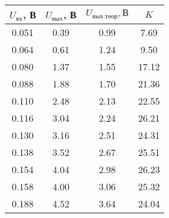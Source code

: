 \begin{tabular}{|c|c|c|c|}
  \hline
$U_{вх}$, В & $U_{вых}$, В & $U_{вых.теор}, В$ & $K$ \\ 
  \hline
0.051 & 0.39 & 0.99 & 7.69 \\ 
   \hline
0.064 & 0.61 & 1.24 & 9.50 \\ 
   \hline
0.080 & 1.37 & 1.55 & 17.12 \\ 
   \hline
0.088 & 1.88 & 1.70 & 21.36 \\ 
   \hline
0.110 & 2.48 & 2.13 & 22.55 \\ 
   \hline
0.116 & 3.04 & 2.24 & 26.21 \\ 
   \hline
0.130 & 3.16 & 2.51 & 24.31 \\ 
   \hline
0.138 & 3.52 & 2.67 & 25.51 \\ 
   \hline
0.154 & 4.04 & 2.98 & 26.23 \\ 
   \hline
0.158 & 4.00 & 3.06 & 25.32 \\ 
   \hline
0.188 & 4.52 & 3.64 & 24.04 \\ 
   \hline
\end{tabular}
